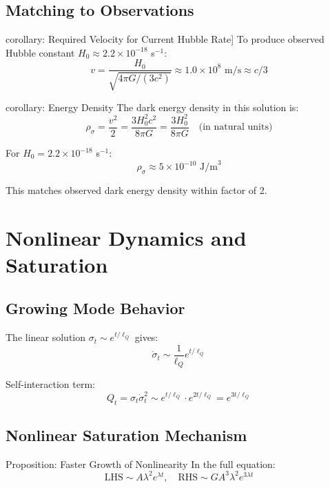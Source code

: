 \documentclass[11pt,a4paper]{article}
\theoremstyle{definition}
\theoremstyle{remark}
\begin{document}
	\subsection{Matching to Observations}
	
	corollary: Required Velocity for Current Hubble Rate]
		To produce observed Hubble constant $H_0 \approx 2.2 \times 10^{-18}$ s$^{-1}$:
		\begin{equation}
			v = \frac{H_0}{\sqrt{4\pi G/(3c^2)}} \approx 1.0 \times 10^8 \text{ m/s} \approx c/3
		\end{equation}
	
	corollary: Energy Density
		The dark energy density in this solution is:
		\begin{equation}
			\rho_\sigma = \frac{v^2}{2} = \frac{3H_0^2 c^2}{8\pi G} = \frac{3H_0^2}{8\pi G} \quad \text{(in natural units)}
		\end{equation}
		
		For $H_0 = 2.2 \times 10^{-18}$ s$^{-1}$:
		\begin{equation}
			\rho_\sigma \approx 5 \times 10^{-10} \text{ J/m}^3
		\end{equation}
		
		This matches observed dark energy density within factor of 2.
	
	\section{Nonlinear Dynamics and Saturation}
	
	\subsection{Growing Mode Behavior}
	
	The linear solution $\sigma_t \sim e^{t/\ell_Q}$ gives:
	\begin{equation}
		\dot{\sigma}_t \sim \frac{1}{\ell_Q}e^{t/\ell_Q}
	\end{equation}
	
	Self-interaction term:
	\begin{equation}
		Q_t = \sigma_t\dot{\sigma}_t^2 \sim e^{t/\ell_Q} \cdot e^{2t/\ell_Q} = e^{3t/\ell_Q}
	\end{equation}
	
	\subsection{Nonlinear Saturation Mechanism}
	
	Proposition: Faster Growth of Nonlinearity
		In the full equation:
		\begin{equation}
			\text{LHS} \sim A\lambda^2 e^{\lambda t}, \quad \text{RHS} \sim GA^3\lambda^2 e^{3\lambda t}
		\end{equation}
		
\end{document}
